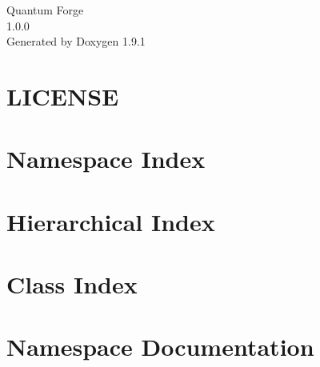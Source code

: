 \let\mypdfximage\pdfximage\def\pdfximage{\immediate\mypdfximage}\documentclass[twoside]{book}
\newcommand{\+}{\discretionary{\mbox{\scriptsize$\hookleftarrow$}}{}{}}
\newcommand{\clearemptydoublepage}{%
  \newpage{\pagestyle{empty}\cleardoublepage}%
}
\begin{document}
\raggedbottom

\hypersetup{pageanchor=false,
             bookmarksnumbered=true,
             pdfencoding=unicode
            }
\begin{titlepage}
\vspace*{7cm}
\begin{center}%
{\Large Quantum Forge \\[1ex]\large 1.\+0.\+0 }\\
\vspace*{1cm}
{\large Generated by Doxygen 1.9.1}\\
\end{center}
\end{titlepage}
\clearemptydoublepage
{}
\tableofcontents
\clearemptydoublepage
{}
\hypersetup{pageanchor=true}

\chapter{LICENSE}
\label{md__runtime__plugins__l_i_c_e_n_s_e}

\chapter{Namespace Index}

\chapter{Hierarchical Index}

\chapter{Class Index}

\chapter{Namespace Documentation}





\end{document}
